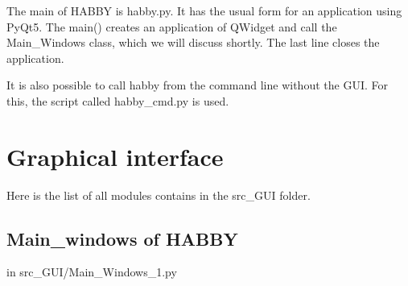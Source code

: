 \documentclass[letterpaper,10pt,english]{sphinxmanual}
\begin{document}
The main of HABBY is habby.py. It has the usual form for an application using PyQt5.  The main() creates an application of QWidget and call the Main\_Windows class, which we will discuss shortly. The last line closes the application.

It is also possible to call habby from the command line without the GUI. For this, the script called habby\_cmd.py is used.


\chapter{Graphical interface}
\label{\detokenize{index:graphical-interface}}
Here is the list of all modules contains in the src\_GUI folder.


\section{Main\_windows of HABBY}
\label{\detokenize{index:main-windows-of-habby}}
in src\_GUI/Main\_Windows\_1.py
\label{\detokenize{index:module-src_GUI}}\label{\detokenize{index:module-src_GUI.Main_windows_1}}
\end{document}
